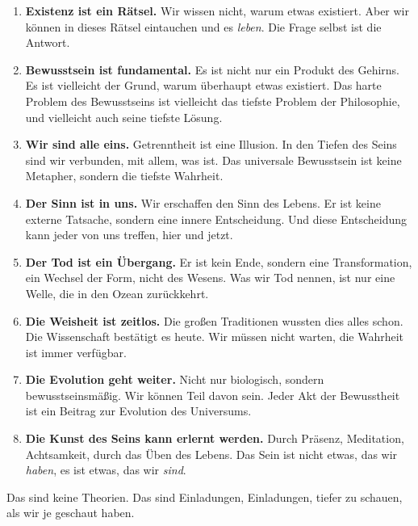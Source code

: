 \begin{enumerate}
	\item \textbf{Existenz ist ein Rätsel.} Wir wissen nicht, warum etwas existiert. Aber wir können in dieses Rätsel eintauchen und es \emph{leben}. Die Frage selbst ist die Antwort.

	\item \textbf{Bewusstsein ist fundamental.} Es ist nicht nur ein Produkt des Gehirns. Es ist vielleicht der Grund, warum überhaupt etwas existiert. Das \glqq harte Problem\grqq{} des Bewusstseins ist vielleicht das tiefste Problem der Philosophie, und vielleicht auch seine tiefste Lösung.

	\item \textbf{Wir sind alle eins.} Getrenntheit ist eine Illusion. In den Tiefen des Seins sind wir verbunden, mit allem, was ist. Das universale Bewusstsein ist keine Metapher, sondern die tiefste Wahrheit.

	\item \textbf{Der Sinn ist in uns.} Wir erschaffen den Sinn des Lebens. Er ist keine externe Tatsache, sondern eine innere Entscheidung. Und diese Entscheidung kann jeder von uns treffen, hier und jetzt.

	\item \textbf{Der Tod ist ein Übergang.} Er ist kein Ende, sondern eine Transformation, ein Wechsel der Form, nicht des Wesens. Was wir \glqq Tod\grqq{} nennen, ist nur eine Welle, die in den Ozean zurückkehrt.

	\item \textbf{Die Weisheit ist zeitlos.} Die großen Traditionen wussten dies alles schon. Die Wissenschaft bestätigt es heute. Wir müssen nicht warten, die Wahrheit ist immer verfügbar.

	\item \textbf{Die Evolution geht weiter.} Nicht nur biologisch, sondern bewusstseinsmäßig. Wir können Teil davon sein. Jeder Akt der Bewusstheit ist ein Beitrag zur Evolution des Universums.

	\item \textbf{Die Kunst des Seins kann erlernt werden.} Durch Präsenz, Meditation, Achtsamkeit, durch das Üben des Lebens. Das Sein ist nicht etwas, das wir \emph{haben}, es ist etwas, das wir \emph{sind}.
\end{enumerate}

Das sind keine Theorien. Das sind Einladungen, Einladungen, tiefer zu schauen, als wir je geschaut haben.

